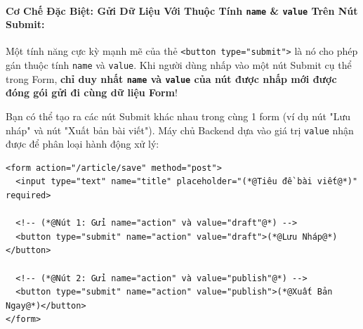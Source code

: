 \documentclass[11pt,oneside]{book}
\newcommand{\codeinline}[1]{\textcolor{accentOrange}{\texttt{#1}}}
\begin{document}
\paragraph{Cơ Chế Đặc Biệt: Gửi Dữ Liệu Với Thuộc Tính \codeinline{name} \& \codeinline{value} Trên Nút Submit:}

Một tính năng cực kỳ mạnh mẽ của thẻ \codeinline{<button type="submit">} là nó cho phép gán thuộc tính \codeinline{name} và \codeinline{value}. Khi người dùng nhấp vào một nút Submit cụ thể trong Form, \textbf{chỉ duy nhất \codeinline{name} và \codeinline{value} của nút được nhấp mới được đóng gói gửi đi cùng dữ liệu Form}!

\begin{tipBox}
Bạn có thể tạo ra các nút Submit khác nhau trong cùng 1 form (ví dụ nút "Lưu nháp" và nút "Xuất bản bài viết"). Máy chủ Backend dựa vào giá trị \codeinline{value} nhận được để phân loại hành động xử lý:
\end{tipBox}

\begin{codeWindow}
\begin{lstlisting}[language=HTML5]
<form action="/article/save" method="post">
  <input type="text" name="title" placeholder="(*@Tiêu đề bài viết@*)" required>
  
  <!-- (*@Nút 1: Gửi name="action" và value="draft"@*) -->
  <button type="submit" name="action" value="draft">(*@Lưu Nháp@*)</button>
  
  <!-- (*@Nút 2: Gửi name="action" và value="publish"@*) -->
  <button type="submit" name="action" value="publish">(*@Xuất Bản Ngay@*)</button>
</form>
\end{lstlisting}
\end{codeWindow}

\begin{browserWindow}
\sffamily\small
{} \\[6pt]
 \quad
{}
\end{browserWindow}
\end{document}
